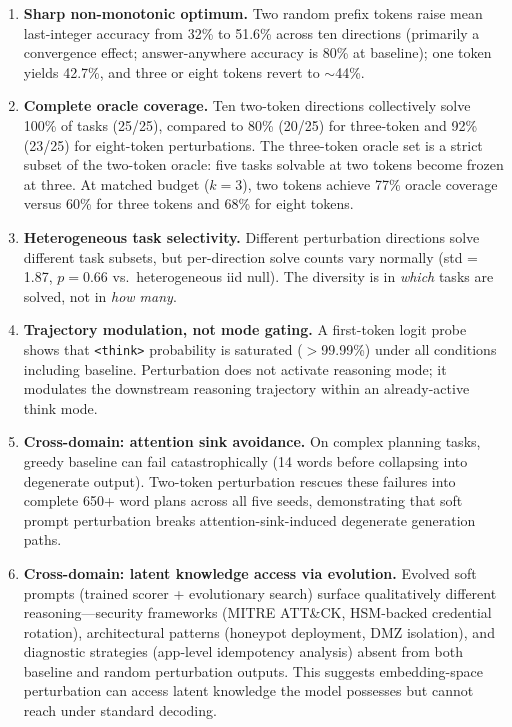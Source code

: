 \documentclass{article}
\begin{document}
\begin{enumerate}
    \item \textbf{Sharp non-monotonic optimum.} Two random prefix tokens
    raise mean last-integer accuracy from 32\% to 51.6\% across ten
    directions (primarily a convergence effect; answer-anywhere accuracy
    is 80\% at baseline); one token yields 42.7\%, and three or eight
    tokens revert to $\sim$44\%.

    \item \textbf{Complete oracle coverage.} Ten two-token directions
    collectively solve 100\% of tasks (25/25), compared to 80\% (20/25)
    for three-token and 92\% (23/25) for eight-token perturbations.
    The three-token oracle set is a strict subset of the two-token
    oracle: five tasks solvable at two tokens become frozen at three.
    At matched budget ($k = 3$), two tokens achieve 77\% oracle coverage
    versus 60\% for three tokens and 68\% for eight tokens.

    \item \textbf{Heterogeneous task selectivity.}
    Different perturbation directions solve different task subsets,
    but per-direction solve counts vary normally (std = 1.87,
    $p = 0.66$ vs.\ heterogeneous iid null). The diversity is in
    \emph{which} tasks are solved, not in \emph{how many}.

    \item \textbf{Trajectory modulation, not mode gating.}
    A first-token logit probe shows that \texttt{<think>} probability
    is saturated ($>$99.99\%) under all conditions including baseline.
    Perturbation does not activate reasoning mode; it modulates the
    downstream reasoning trajectory within an already-active think
    mode.

    \item \textbf{Cross-domain: attention sink avoidance.}
    On complex planning tasks, greedy baseline can fail catastrophically
    (14 words before collapsing into degenerate output). Two-token
    perturbation rescues these failures into complete 650+ word plans
    across all five seeds, demonstrating that soft prompt perturbation
    breaks attention-sink-induced degenerate generation paths.

    \item \textbf{Cross-domain: latent knowledge access via evolution.}
    Evolved soft prompts (trained scorer + evolutionary search) surface
    qualitatively different reasoning---security frameworks (MITRE
    ATT\&CK, HSM-backed credential rotation), architectural patterns
    (honeypot deployment, DMZ isolation), and diagnostic strategies
    (app-level idempotency analysis) absent from both baseline and
    random perturbation outputs. This suggests embedding-space
    perturbation can access latent knowledge the model possesses but
    cannot reach under standard decoding.


\end{enumerate}
\end{document}
